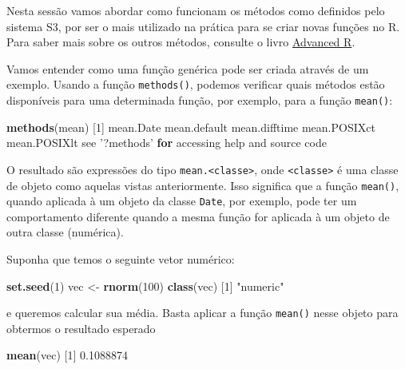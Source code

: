 \documentclass[10pt,a4paper]{book}
\newenvironment{Shaded}{\begin{snugshade}}{\end{snugshade}}
\newcommand{\KeywordTok}[1]{\textcolor[rgb]{0.13,0.29,0.53}{\textbf{#1}}}
\newcommand{\DecValTok}[1]{\textcolor[rgb]{0.00,0.00,0.81}{#1}}
\newcommand{\FloatTok}[1]{\textcolor[rgb]{0.00,0.00,0.81}{#1}}
\newcommand{\StringTok}[1]{\textcolor[rgb]{0.31,0.60,0.02}{#1}}
\newcommand{\ControlFlowTok}[1]{\textcolor[rgb]{0.13,0.29,0.53}{\textbf{#1}}}
\newcommand{\NormalTok}[1]{#1}
\begin{document}
Nesta sessão vamos abordar como funcionam os métodos como definidos pelo
sistema S3, por ser o mais utilizado na prática para se criar novas
funções no R. Para saber mais sobre os outros métodos, consulte o livro
\href{http://adv-r.had.co.nz/OO-essentials.html}{Advanced R}.

Vamos entender como uma função genérica pode ser criada através de um
exemplo. Usando a função \texttt{methods()}, podemos verificar quais
métodos estão disponíveis para uma determinada função, por exemplo, para
a função \texttt{mean()}:

\begin{Shaded}
\begin{Highlighting}[]
\KeywordTok{methods}\NormalTok{(mean)}
\NormalTok{[}\DecValTok{1}\NormalTok{] mean.Date     mean.default  mean.difftime mean.POSIXct  mean.POSIXlt }
\NormalTok{see }\StringTok{'?methods'} \ControlFlowTok{for}\NormalTok{ accessing help and source code}
\end{Highlighting}
\end{Shaded}

O resultado são expressões do tipo
\texttt{mean.\textless{}classe\textgreater{}}, onde
\texttt{\textless{}classe\textgreater{}} é uma classe de objeto como
aquelas vistas anteriormente. Isso significa que a função
\texttt{mean()}, quando aplicada à um objeto da classe \texttt{Date},
por exemplo, pode ter um comportamento diferente quando a mesma função
for aplicada à um objeto de outra classe (numérica).

Suponha que temos o seguinte vetor numérico:

\begin{Shaded}
\begin{Highlighting}[]
\KeywordTok{set.seed}\NormalTok{(}\DecValTok{1}\NormalTok{)}
\NormalTok{vec <-}\StringTok{ }\KeywordTok{rnorm}\NormalTok{(}\DecValTok{100}\NormalTok{)}
\KeywordTok{class}\NormalTok{(vec)}
\NormalTok{[}\DecValTok{1}\NormalTok{] }\StringTok{"numeric"}
\end{Highlighting}
\end{Shaded}

e queremos calcular sua média. Basta aplicar a função \texttt{mean()}
nesse objeto para obtermos o resultado esperado

\begin{Shaded}
\begin{Highlighting}[]
\KeywordTok{mean}\NormalTok{(vec)}
\NormalTok{[}\DecValTok{1}\NormalTok{] }\FloatTok{0.1088874}
\end{Highlighting}
\end{Shaded}
\end{document}
